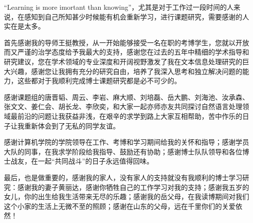 

\begin{ack}
“Learning is more imortant than knowing”，尤其是对于工作过一段时间的人来说，在感知到自己所知甚少时候能有机会重新学习，进行课题研究，需要感谢的人实在是太多。

首先感谢我的导师王挺教授，从一开始能够接受一名在职的考博学生，您就以开放而又严谨的治学态度给予我最大的支持，感谢您在过去的五年中精细的学术指导和研究建议，您在学术领域的专业深度和开阔视野激发了我在文本信息处理研究的巨大兴趣，感谢您让我拥有充分的研究自由，培养了我深入思考和独立解决问题的能力，这些都对于我顺利完成博士课题研究都是必不可少的。

感谢课题组的唐晋韬、周云、李岩、麻大顺、刘培磊、岳大鹏、刘海池、汝承森、张文文、姜仁会、胡长龙、李欣奕，和大家一起亦师亦友共同探讨自然语言处理领域最前沿的问题让我获益非浅，在艰辛的求学到路上大家互相帮助，苦中作乐的日子让我重新体会到了无私的同学友谊。

感谢计算机学院的学院领导在工作、考博和学习期间给我的关怀和指导；感谢学员大队的同事，在我求学阶段给我指导、鼓励还有协助；感谢博士队队领导和各位博士战友，在一起“共同战斗”的日子永远值得回味。

最后，也是做重要的，感谢我的家人，没有家人的支持就没有我顺利的博士学习研究：感谢我的妻子黄丽达，感谢你牺牲自己的工作学习对我的支持；感谢我五岁的女儿，你的出生给我生活带来无尽的乐趣；感谢我的岳父母，在我读博期间对我们这个小家的生活上无微不至的照顾；感谢在山东的父母，远在千里你们的关爱依然！
\end{ack}
\newpage 
\mbox{} 
\newpage
